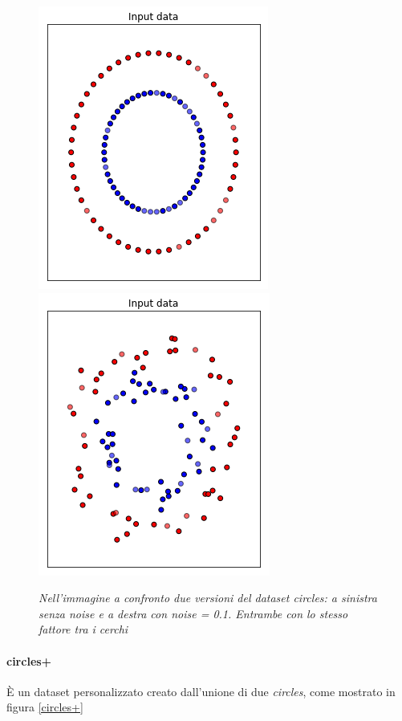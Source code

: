 \documentclass[12pt,a4paper]{report}
\begin{document}
\begin{figure}[H]
 \centering
 \includegraphics[scale = 0.5]{images/circles_nonoise}
 \includegraphics[scale = 0.5]{images/circles_noise}
 \caption{\textit{Nell'immagine a confronto due versioni del dataset circles: a sinistra senza noise e a destra con noise = 0.1. Entrambe con lo stesso fattore tra i cerchi}}
 \label{circles}
\end{figure}

\paragraph{circles+} È un dataset personalizzato creato dall'unione di due \textit{circles}, come mostrato in figura \ref{circles+}
\end{document}
